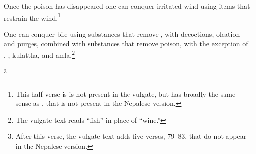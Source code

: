 \begin{translation}
\item[52.1]

Once the poison has disappeared  one can conquer irritated wind using items 
that restrain the wind.\footnote{This half-verse is is not present in the vulgate, 
but has broadly the same sense as , that is not present in 
the Nepalese version.}

\item [53] One can conquer bile using substances that remove
, with decoctions, oleation and purges,
combined with substances that remove poison,
with the exception of , ,
\gls{kulattha}, and \gls{amla}.\footnote{The vulgate text reads “fish” in
    place of “wine.”}










    
    \strut
    \bigskip
    
       
     \item[78] 
     
     \footnote{After this verse, the vulgate text adds five
        verses, 79--83, that do not appear in the Nepalese version.}
\end{translation}    
